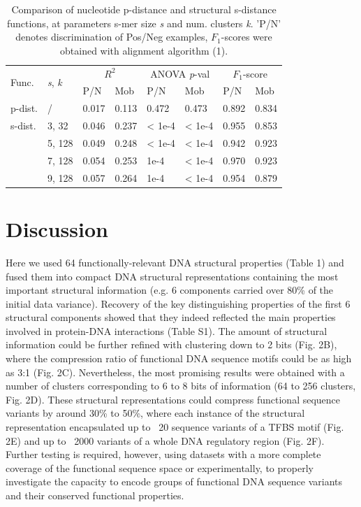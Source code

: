 \documentclass[sigconf]{acmart}
\begin{document}
\begin{table}
  \caption{Comparison of nucleotide p-distance and structural s-distance functions, at parameters s-mer size \textit{s} and num. clusters \textit{k}. 'P/N' denotes discrimination of Pos/Neg examples, $F_1$-scores were obtained with alignment algorithm (1).}
  \begin{tabular}{p{0.83cm}|p{0.7cm}|p{0.7cm}|p{0.7cm}|p{0.73cm}|p{0.73cm}|p{0.7cm}|p{0.7cm}}
  \toprule
  \multirow{2}{*}{Func.} & 
  \multirow{2}{*}{\textit{s}, \textit{k}} & 
  \multicolumn{2}{c}{\textit{$R^2$}} & 
  \multicolumn{2}{c}{ANOVA \textit{p}-val} & 
  \multicolumn{2}{c}{$F_1$-score} \\
  \cline{3-8} & & P/N & Mob & P/N & Mob& P/N & Mob \\
  \midrule
    p-dist. & / & 0.017 & 0.113 & 0.472 & 0.473 & 0.892 & 0.834\\
    s-dist. & 3, 32 & 0.046 & 0.237 & < 1e-4 & < 1e-4 & 0.955 & 0.853\\
     & 5, 128 & 0.049 & 0.248 & < 1e-4 & < 1e-4 & 0.942 & 0.923\\
     & 7, 128 & 0.054 & 0.253 & 1e-4 & < 1e-4 & 0.970 & 0.923\\
     & 9, 128 & 0.057 & 0.264 & 1e-4 & < 1e-4 & 0.954 & 0.879\\
  \bottomrule
  \end{tabular}
\end{table}

\section{Discussion}
Here we used 64 functionally-relevant DNA structural properties (Table 1) and fused them into compact DNA structural representations containing the most important structural information (e.g. 6 components carried over 80\% of the initial data variance). Recovery of the key distinguishing properties of the first 6 structural components showed that they indeed reflected the main properties involved in protein-DNA interactions (Table S1). The amount of structural information could be further refined with clustering down to 2 bits (Fig. 2B), where the compression ratio of functional DNA sequence motifs could be as high as 3:1 (Fig. 2C). Nevertheless, the most promising results were obtained with a number of clusters corresponding to 6 to 8 bits of information (64 to 256 clusters, Fig. 2D). These structural representations could compress functional sequence variants by around 30\% to 50\%, where each instance of the structural representation encapsulated up to ~20 sequence variants of a TFBS motif (Fig. 2E) and up to ~2000 variants of a whole DNA regulatory region (Fig. 2F). Further testing is required, however, using datasets with a more complete coverage of the functional sequence space or experimentally, to properly investigate the capacity to encode groups of functional DNA sequence variants and their conserved functional properties. 
\end{document}
